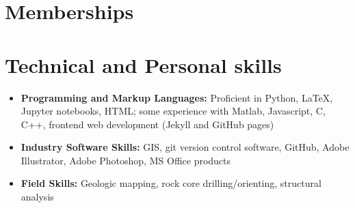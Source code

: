 \documentclass[11pt,a4paper,sans]{moderncv}
\begin{document}
\section{Memberships}






\section{Technical and Personal skills}

\vspace{6pt}

\begin{itemize}

    

    \item \textbf{Programming and Markup Languages:} Proficient in Python,
        {\selectfont\LaTeX}, Jupyter notebooks, HTML; some
        experience with  Matlab, Javascript, C, C{++}, frontend web development
        (Jekyll and GitHub pages)

    \vspace{6pt}

    \item \textbf{Industry Software Skills:} GIS, git version control software,
        GitHub, Adobe Illustrator, Adobe Photoshop, MS Office products

    \vspace{6pt}

    \item \textbf{Field Skills:} Geologic mapping, rock core drilling/orienting,
        structural analysis

\end{itemize}
\end{document}

